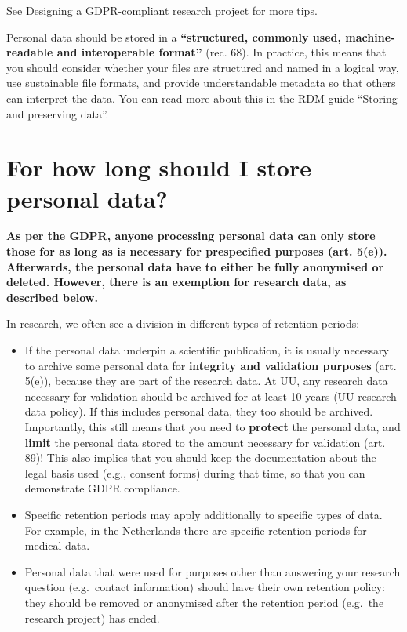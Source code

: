 \documentclass[
]{book}
\providecommand{\tightlist}{%
  \setlength{\itemsep}{0pt}\setlength{\parskip}{0pt}}
\begin{document}
See Designing a GDPR-compliant research project for more tips.

Personal data should be stored in a \textbf{``structured, commonly used, machine-readable
and interoperable format''} (rec. 68).
In practice, this means that you should consider whether your files are
structured and named in a logical way, use
sustainable file formats,
and provide understandable metadata so that others can interpret the data.
You can read more about this in the RDM guide
``Storing and preserving data''.

\hypertarget{data-storage-duration}{%
\section{For how long should I store personal data?}\label{data-storage-duration}}

\textbf{As per the GDPR, anyone processing personal data can only store those for as
long as is necessary for prespecified purposes
(art. 5(e)).
Afterwards, the personal data have to either be fully anonymised or deleted.
However, there is an exemption for research data, as described below.}

In research, we often see a division in different types of retention periods:

\begin{itemize}
\tightlist
\item
  If the personal data underpin a scientific publication, it is usually necessary
  to archive some personal data for \textbf{integrity and validation purposes}
  (art. 5(e)),
  because they are part of the research data. At UU, any research data necessary
  for validation should be archived for at least 10 years
  (UU research data policy).
  If this includes personal data, they too should be archived. Importantly, this
  still means that you need to \textbf{protect} the personal data, and \textbf{limit} the personal
  data stored to the amount necessary for validation
  (art. 89)!
  This also implies that you should keep the documentation about the legal basis
  used (e.g., consent forms) during that time, so that you can demonstrate GDPR
  compliance.
\item
  Specific retention periods may apply additionally to specific types of data.
  For example, in the Netherlands there are specific retention periods for medical data.
\item
  Personal data that were used for purposes other than answering your
  research question (e.g.~contact information) should have their own retention
  policy: they should be removed or anonymised after the retention period
  (e.g.~the research project) has ended.
\end{itemize}
\end{document}
